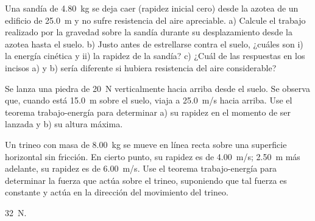 \documentclass[11pt]{article}
\begin{document}
\begin{exercise}
    Una sandía de \qty{4.80}{kg} se deja caer (rapidez inicial cero) desde la azotea de un edificio de \qty{25.0}{m} y no sufre resistencia del aire apreciable. a) Calcule el trabajo realizado por la gravedad sobre la sandía durante su desplazamiento desde la azotea hasta el suelo. b) Justo antes de estrellarse contra el suelo, ¿cuáles son i) la energía cinética y ii) la rapidez de la sandía? c) ¿Cuál de las respuestas en los incisos a) y b) sería diferente si hubiera resistencia del aire considerable?
\end{exercise}

\begin{exercise}
    Se lanza una piedra de \qty{20}{N} verticalmente hacia arriba desde el suelo. Se observa que, cuando está \qty{15.0}{m} sobre el suelo, viaja a \qty{25.0}{m/s} hacia arriba. Use el teorema trabajo-energía para determinar a) su rapidez en el momento de ser lanzada y b) su altura máxima.
\end{exercise}

\begin{multicols}{2}
\begin{exercise}
    Un trineo con masa de \qty{8.00}{kg} se mueve en línea recta sobre una superficie horizontal sin fricción. En cierto punto, su rapidez es de \qty{4.00}{m/s}; \qty{2.50}{m} más adelante, su rapidez es de \qty{6.00}{m/s}. Use el teorema trabajo-energía para determinar la fuerza que actúa sobre el trineo, suponiendo que tal fuerza es constante y actúa en la dirección del movimiento del trineo.
\end{exercise}
\begin{solution}
    \qty{32}{N}.
\end{solution}
\end{multicols}
\end{document}

